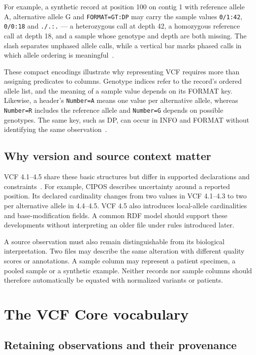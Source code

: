 \documentclass{ceurart}
\newcommand{\term}[1]{\texttt{#1}}
\begin{document}
For example, a synthetic record at position 100 on contig 1 with reference allele A, alternative allele G and \term{FORMAT=GT:DP} may carry the sample values \term{0/1:42}, \term{0/0:18} and \term{./.:.} --- a heterozygous call at depth 42, a homozygous reference call at depth 18, and a sample whose genotype and depth are both missing. 
The slash separates unphased allele calls, while a vertical bar marks phased calls in which allele ordering is meaningful~\cite{vcf45}.

These compact encodings illustrate why representing VCF requires more than assigning predicates to columns. 
Genotype indices refer to the record's ordered allele list, and the meaning of a sample value depends on its FORMAT key. 
Likewise, a header's \term{Number=A} means one value per alternative allele, whereas \term{Number=R} includes the reference allele and \term{Number=G} depends on possible genotypes. 
The same key, such as DP, can occur in INFO and FORMAT without identifying the same observation~\cite{vcf45}.

\subsection{Why version and source context matter}

VCF 4.1--4.5 share these basic structures but differ in supported declarations and constraints~\cite{htsspecs,vcf45}. 
For example, CIPOS describes uncertainty around a reported position. 
Its declared cardinality changes from two values in VCF 4.1--4.3 to two per alternative allele in 4.4--4.5. 
VCF 4.5 also introduces local-allele cardinalities and base-modification fields. 
A common RDF model should support these developments without interpreting an older file under rules introduced later.

A source observation must also remain distinguishable from its biological interpretation. 
Two files may describe the same alteration with different quality scores or annotations. 
A sample column may represent a patient specimen, a pooled sample or a synthetic example. 
Neither records nor sample columns should therefore automatically be equated with normalized variants or patients.

\section{The VCF Core vocabulary}
\label{sec:design}

\subsection{Retaining observations and their provenance}
\end{document}
